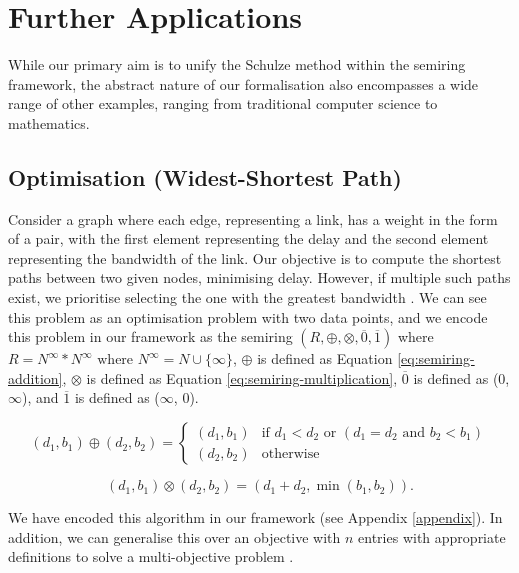 \documentclass[a4paper,UKenglish,cleveref, autoref, thm-restate, anonymous]{lipics-v2021}
\begin{document}
\section{Further Applications}
\label{sec:applications}
While our primary aim is to unify the Schulze method within the semiring framework, the abstract nature of our formalisation also encompasses a wide range of other examples, ranging from traditional computer science to mathematics.



\subsection{Optimisation (Widest-Shortest Path)}
Consider a graph where each edge, representing a link, has a weight in the form of a pair, with the first element representing the delay and the second element representing the bandwidth of the link. Our objective is to compute the shortest paths between two given nodes, minimising delay. However, if multiple such paths exist, we prioritise selecting the one with the greatest bandwidth \cite{baras2022path}. We can see this problem as an optimisation problem with two data points, and we encode this problem in our framework 
as the semiring $(R, \oplus, \otimes, \overline{0}, \overline{1})$ where 
$R = N^{\infty} * N^{\infty} \text{ where }N^{\infty} = N \cup\{\infty\}$, $\oplus$ is defined as  Equation \ref{eq:semiring-addition}, 
$\otimes$ is defined as Equation \ref{eq:semiring-multiplication}, 
$\overline{0}$ is defined as (0, $\infty$), and 
$\overline{1}$ is defined as ($\infty$, 0).



\begin{equation}\label{eq:semiring-addition}
  (d_1, b_1) \oplus (d_2, b_2) = 
  \begin{cases}
    (d_1, b_1) & \text{if } d_1 < d_2 \text{ or } (d_1 = d_2 \text{ and } b_2 < b_1) \\
    (d_2, b_2) & \text{otherwise}   
  \end{cases}
\end{equation}


\begin{equation}\label{eq:semiring-multiplication}
  (d_1, b_1) \otimes (d_2, b_2) = (d_1 + d_2, \min(b_1, b_2)).
\end{equation}


We have encoded this algorithm in our framework (see Appendix \ref{appendix}). In addition, 
we can generalise this over an objective with $n$ entries with
appropriate definitions to solve a multi-objective problem \cite{manger2020algebraic}. 
\end{document}
